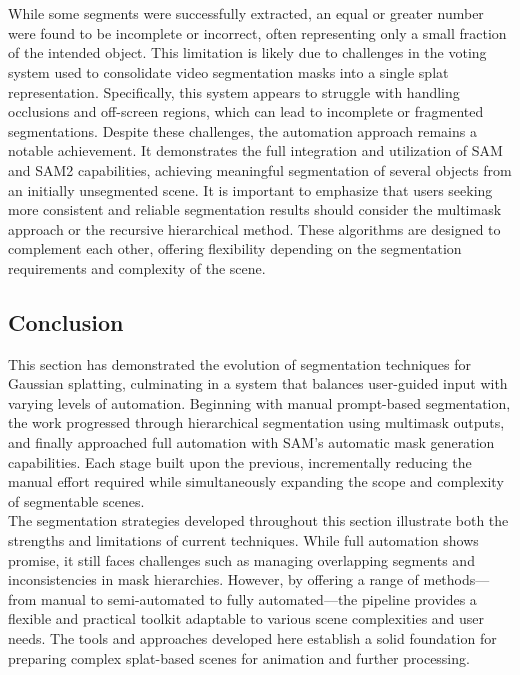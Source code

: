 \documentclass[12pt]{article}
\begin{document}
\\\\
While some segments were successfully extracted, an equal or greater number were found to be incomplete or incorrect, often representing only a small fraction of the intended object. This limitation is likely due to challenges in the voting system used to consolidate video segmentation masks into a single splat representation. Specifically, this system appears to struggle with handling occlusions and off-screen regions, which can lead to incomplete or fragmented segmentations. Despite these challenges, the automation approach remains a notable achievement. It demonstrates the full integration and utilization of SAM and SAM2 capabilities, achieving meaningful segmentation of several objects from an initially unsegmented scene. It is important to emphasize that users seeking more consistent and reliable segmentation results should consider the multimask approach or the recursive hierarchical method. These algorithms are designed to complement each other, offering flexibility depending on the segmentation requirements and complexity of the scene.
\subsection{Conclusion}
This section has demonstrated the evolution of segmentation techniques for Gaussian splatting, culminating in a system that balances user-guided input with varying levels of automation. Beginning with manual prompt-based segmentation, the work progressed through hierarchical segmentation using multimask outputs, and finally approached full automation with SAM’s automatic mask generation capabilities. Each stage built upon the previous, incrementally reducing the manual effort required while simultaneously expanding the scope and complexity of segmentable scenes.
\\
The segmentation strategies developed throughout this section illustrate both the strengths and limitations of current techniques. While full automation shows promise, it still faces challenges such as managing overlapping segments and inconsistencies in mask hierarchies. However, by offering a range of methods—from manual to semi-automated to fully automated—the pipeline provides a flexible and practical toolkit adaptable to various scene complexities and user needs. The tools and approaches developed here establish a solid foundation for preparing complex splat-based scenes for animation and further processing.
\end{document}

